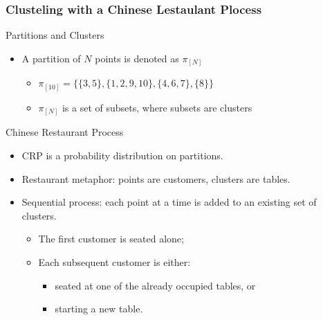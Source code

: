 \documentclass{beamer}
\begin{document}
\begin{frame}
    \frametitle{Clusteling with a Chinese Lestaulant Plocess}
    
    \begin{block}{Partitions and Clusters}
        \begin{itemize}
            \item A partition of $N$ points is denoted as $\pi_{[N]}$
            \begin{itemize}
                \item $\pi_{[10]} = \{\{3,5\},\{1,2,9,10\},\{4,6,7\},\{8\}\}$
                \item $\pi_{[N]}$ is a set of subsets, where subsets are clusters
            \end{itemize}
        \end{itemize}
    \end{block}

    \begin{block}{Chinese Restaurant Process}
        \begin{itemize}
            \item CRP is a probability distribution on partitions.
            \item Restaurant metaphor: points are customers, clusters are tables.
            \item Sequential process: each point at a time is added to an existing set of clusters.
            \begin{itemize}
                \item The first customer is seated alone;
                \item Each subsequent customer is either:
                \begin{itemize}
                    \item seated at one of the already occupied tables, or
                    \item starting a new table.
                \end{itemize}
            \end{itemize}   
        \end{itemize}
    \end{block}
\end{frame}
\end{document}
